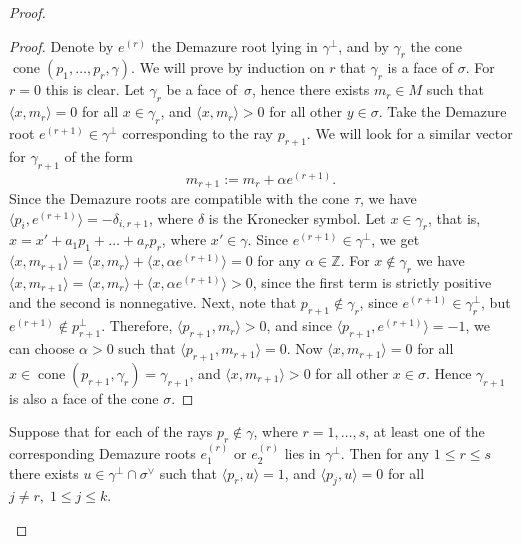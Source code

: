 \documentclass[10pt,a4paper]{amsart}
\DeclareMathOperator{\cone}{cone}
\newcommand{\ZZ}{\mathbb{Z}}
\begin{document}
\begin{proof}
	\begin{proof}
	Denote by $e^{(r)}$ the Demazure root lying in $\gamma^\perp$, and by $\gamma_r$ the cone $\cone(p_1, \ldots, p_r, \gamma)$. We will prove by induction on $r$ that $\gamma_r$ is a face of $\sigma$. For $r = 0$ this is clear. Let $\gamma_r$ be a face of~$\sigma$, hence there exists $m_r \in M$ such that $\langle x, m_r\rangle = 0$ for all $x \in \gamma_r$, and $\langle x, m_r\rangle > 0$ for all other $y \in \sigma$. Take the Demazure root $e^{(r+1)} \in \gamma^\perp$ corresponding to the ray $p_{r+1}$. We will look for a similar vector for $\gamma_{r+1}$ of the form
	$$m_{r+1}:=m_r + \alpha e^{(r+1)}. $$ 
	Since the Demazure roots are compatible with the cone $\tau$, we have $\langle p_i,  e^{(r+1)} \rangle = -\delta_{i, r+1}$, where $\delta$ is the Kronecker symbol. Let $x \in \gamma_r$, that is, $x = x' + a_1 p_1 + \ldots + a_r p_r$, where ${x' \in \gamma}$. Since $e^{(r + 1)} \in \gamma^\perp$, we get $\langle x , m_{r+1} \rangle = \langle x , m_r \rangle + \langle x , \alpha e^{(r+1)} \rangle = 0$ for any $\alpha \in \ZZ$. For $x \notin \gamma_r$ we have $\langle x , m_{r+1} \rangle = \langle x , m_r \rangle  + \langle x , \alpha e^{(r+1)} \rangle > 0$, since the first term is strictly positive and the second is nonnegative. Next, note that $p_{r+1} \notin \gamma_r$, since $e^{(r+1)} \in \gamma_r^\perp$, but $e^{(r+1)} \notin p_{r+1}^\perp$. Therefore, $\langle p_{r+1} , m_r  \rangle > 0 $, and since $\langle p_{r+1} , e^{(r+1)} \rangle = -1$, we can choose $\alpha > 0$ such that $\langle p_{r+1} ,m_{r+1}\rangle = 0$. Now $\langle x, m_{r+1} \rangle = 0$ for all $x \in \cone(p_{r+1}, \gamma_r) = \gamma_{r+1}$, and $\langle x, m_{r+1} \rangle > 0$ for all other $x \in \sigma$. Hence $\gamma_{r+1}$ is also a face of the cone $\sigma$.
	\end{proof}

\begin{lemma}\label{lm:perpcone}
Suppose that for each of the rays $p_r \notin \gamma$, where $r = 1, \ldots, s$, at least one of the corresponding Demazure roots $e_1^{(r)}$ or $e_2^{(r)}$ lies in $\gamma^\perp$. Then for any $1 \leq r \leq s$ there exists $u \in \gamma^\perp \cap \sigma^\vee$ such that $\langle p_r, u \rangle = 1$, and $\langle p_j, u \rangle = 0$ for all $j \neq r,\; 1 \leq j \leq k$.
\end{lemma}


\end{proof}
\end{document}
